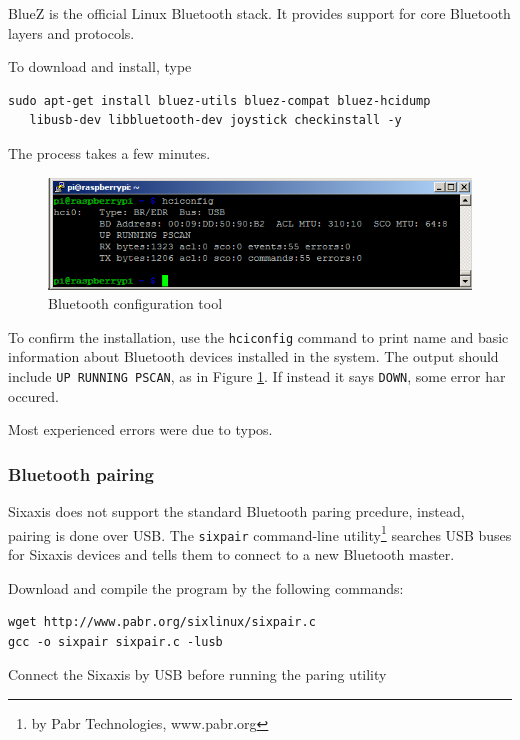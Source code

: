 \documentclass[a4paper,twoside,english]{report}
\begin{document}
BlueZ is the official Linux Bluetooth stack. It provides support for
core Bluetooth layers and protocols.

To download and install, type

\begin{verbatim}sudo apt-get install bluez-utils bluez-compat bluez-hcidump
   libusb-dev libbluetooth-dev joystick checkinstall -y\end{verbatim}

The process takes a few minutes.

\begin{figure}[h!]
\centering \includegraphics[scale=0.45]{fig/rpi_hciconfig} \caption{Bluetooth configuration tool}
\label{fig: RPi hciconfig} 
\end{figure}
To confirm the installation, use the \texttt{hciconfig} command to
print name and basic information about Bluetooth devices installed
in the system. The output should include \texttt{UP RUNNING PSCAN},
as in Figure \ref{fig: RPi hciconfig}. If instead it says \texttt{DOWN},
some error har occured.

Most experienced errors were due to typos.

\subsubsection{\label{par: Bluetooth-pairing}Bluetooth pairing}

Sixaxis does not support the standard Bluetooth paring prcedure, instead,
pairing is done over USB. The \texttt{sixpair} command-line utility\footnote{by Pabr Technologies, www.pabr.org}
searches USB buses for Sixaxis devices and tells them to connect to
a new Bluetooth master.

Download and compile the program by the following commands:

\begin{verbatim}wget http://www.pabr.org/sixlinux/sixpair.c
gcc -o sixpair sixpair.c -lusb\end{verbatim}

Connect the Sixaxis by USB before running the paring utility
\end{document}

